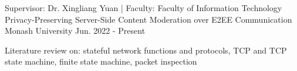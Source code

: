 

\begin{cventries}


   \cventry
   {Supervisor: Dr. Xingliang Yuan | Faculty: Faculty of Information Technology} %
   {Privacy-Preserving Server-Side Content Moderation over E2EE Communication} %
   {Monash University} %
   {Jun. 2022 - Present} %
   {
      \begin{cvitems} %
         \item {Literature review on: stateful network functions and protocols, TCP and TCP state machine, finite state machine, packet inspection}
      \end{cvitems}
   }

\end{cventries}
\vspace{-3.0mm}
